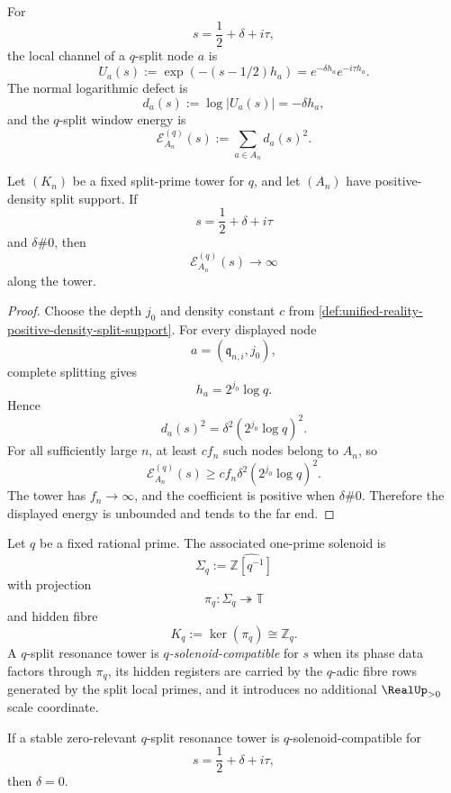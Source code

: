 \begin{definition}
\label{def:unified-reality-q-split-normal-energy}
For
$$
s=\frac12+\delta+i\tau,
$$
the local channel of a $q$-split node $a$ is
$$
U_a(s):=\exp(-(s-1/2)h_a)
=
e^{-\delta h_a}e^{-i\tau h_a}.
$$
The normal logarithmic defect is
$$
d_a(s):=\log |U_a(s)|=-\delta h_a,
$$
and the $q$-split window energy is
$$
\mathcal E_{A_n}^{(q)}(s)
:=
\sum_{a\in A_n}d_a(s)^2.
$$
\end{definition}

\begin{theorem}
\label{thm:unified-reality-one-split-prime-detects-off-half}
Let $(K_n)$ be a fixed split-prime tower for $q$, and let $(A_n)$ have
positive-density split support.  If
$$
s=\frac12+\delta+i\tau
$$
and $\delta\#0$, then
$$
\mathcal E_{A_n}^{(q)}(s)\to\infty
$$
along the tower.
\end{theorem}

\begin{proof}
Choose the depth $j_0$ and density constant $c$ from
\autoref{def:unified-reality-positive-density-split-support}.  For every
displayed node
$$
a=(\mathfrak q_{n,i},j_0),
$$
complete splitting gives
$$
h_a=2^{j_0}\log q.
$$
Hence
$$
d_a(s)^2
=
\delta^2(2^{j_0}\log q)^2.
$$
For all sufficiently large $n$, at least $c f_n$ such nodes belong to
$A_n$, so
$$
\mathcal E_{A_n}^{(q)}(s)
\ge
c f_n\delta^2(2^{j_0}\log q)^2.
$$
The tower has $f_n\to\infty$, and the coefficient is positive when
$\delta\#0$.  Therefore the displayed energy is unbounded and tends to
the far end.
\end{proof}

\begin{definition}
\label{def:unified-reality-q-solenoid-resonance-compatibility}
Let $q$ be a fixed rational prime.  The associated one-prime solenoid is
$$
\Sigma_q:=\widehat{\mathbb Z[q^{-1}]}
$$
with projection
$$
\pi_q:\Sigma_q\twoheadrightarrow\mathbb T
$$
and hidden fibre
$$
K_q:=\ker(\pi_q)\cong\mathbb Z_q.
$$
A $q$-split resonance tower is \emph{$q$-solenoid-compatible} for $s$
when its phase data factors through $\pi_q$, its hidden registers are
carried by the $q$-adic fibre rows generated by the split local primes,
and it introduces no additional $\RealUp_{>0}$ scale coordinate.
\end{definition}

\begin{theorem}
\label{thm:unified-reality-q-solenoid-compatibility-unit-boundary}
If a stable zero-relevant $q$-split resonance tower is
$q$-solenoid-compatible for
$$
s=\frac12+\delta+i\tau,
$$
then $\delta=0$.
\end{theorem}

